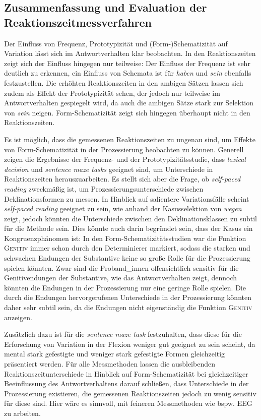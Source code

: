 \subsection{Zusammenfassung und Evaluation der Reaktionszeitmessverfahren}

Der Einfluss von Frequenz, Prototypizität und (Form-)Schematizität auf Variation lässt sich im Antwortverhalten klar beobachten. In den Reaktionszeiten zeigt sich der Einfluss hingegen nur teilweise: Der Einfluss der Frequenz ist sehr deutlich zu erkennen, ein Einfluss von Schemata ist für \textit{haben} und \textit{sein} ebenfalls festzustellen. Die erhöhten Reaktionszeiten in den ambigen Sätzen lassen sich zudem als Effekt der Prototypizität sehen, der jedoch nur teilweise im Antwortverhalten gespiegelt wird, da auch die ambigen Sätze stark zur Selektion von \textit{sein} neigen. Form-Schematizität zeigt sich hingegen überhaupt nicht in den Reaktionszeiten. 

Es ist möglich, dass die gemessenen Reaktionszeiten zu ungenau sind, um Effekte von Form-Schematizität in der Prozessierung beobachten zu können. Generell zeigen die Ergebnisse der Frequenz- und der Prototypizitätsstudie, dass \textit{lexical decision} und \textit{sentence maze tasks} geeignet sind, um Unterschiede in Reaktionszeiten herauszuarbeiten.  Es stellt sich aber die Frage, ob \textit{self-paced reading} zweckmäßig ist, um  Prozessierungsunterschiede zwischen Deklinationsformen zu messen. In Hinblick auf salientere Variationsfälle scheint \textit{self-paced reading} geeignet zu sein, wie \textcite{Schmitt.2019b} anhand der Kasusselektion von \textit{wegen} zeigt, jedoch könnten die Unterschiede zwischen den Deklinationsklassen zu subtil für die Methode sein. Dies könnte auch darin begründet sein, dass der Kasus ein Kongruenzphänomen ist: In den Form-Schematizitätsstudien war die Funktion \textsc{Genitiv} immer schon durch den Determinierer markiert, sodass die starken und schwachen Endungen der Substantive keine so große Rolle für die Prozessierung spielen könnten. Zwar sind die Proband\_innen offensichtlich sensitiv für die Genitivendungen der Substantive, wie das Antwortverhalten zeigt, dennoch könnten die Endungen in der Prozessierung nur eine geringe Rolle spielen. Die durch die Endungen hervorgerufenen Unterschiede in der Prozessierung könnten daher sehr subtil sein, da die Endungen nicht eigenständig die Funktion \textsc{Genitiv} anzeigen. 



Zusätzlich dazu ist für die \textit{sentence maze task} festzuhalten, dass diese für die Erforschung von Variation in der Flexion weniger gut geeignet zu sein scheint, da mental stark gefestigte und weniger stark gefestigte Formen gleichzeitig präsentiert werden. Für alle Messmethoden lassen die ausbleibenden Reaktionszeitunterschiede in Hinblick auf Form-Schematizität bei gleichzeitiger Beeinflussung des Antwortverhaltens darauf schließen, dass Unterschiede in der Prozessierung existieren, die gemessenen Reaktionszeiten jedoch zu wenig sensitiv für diese sind. Hier wäre es sinnvoll, mit feineren Messmethoden wie bspw. EEG zu arbeiten. 

